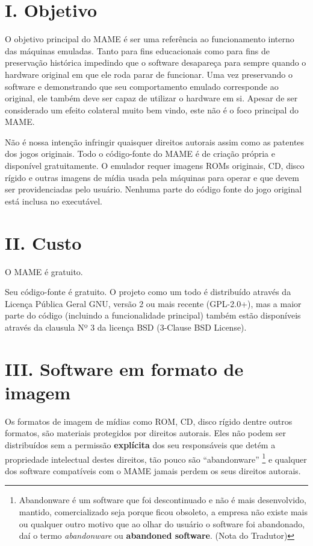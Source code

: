 \documentclass[letterpaper,10pt,brazil]{sphinxmanual}
\begin{document}
\section{I. Objetivo}
\label{whatis:i-objetivo}
O objetivo principal do MAME é ser uma referência ao funcionamento
interno das máquinas emuladas. Tanto para fins educacionais como para
fins de preservação histórica impedindo que o software desapareça para
sempre quando o hardware original em que ele roda parar de funcionar.
Uma vez preservando o software e demonstrando que seu comportamento
emulado corresponde ao original, ele também deve ser capaz de utilizar o
hardware em si. Apesar de ser considerado um efeito colateral muito bem
vindo, este não é o foco principal do MAME.

Não é nossa intenção infringir quaisquer direitos autorais assim como as
patentes dos jogos originais. Todo o código-fonte do MAME é de criação
própria e disponível gratuitamente. O emulador requer imagens ROMs
originais, CD, disco rígido e outras imagens de mídia usada pela máquinas
para operar e que devem ser providenciadas pelo usuário. Nenhuma parte
do código fonte do jogo original está inclusa no executável.
\clearpage

\section{II. Custo}
\label{whatis:ii-custo}
O MAME é gratuito.

Seu código-fonte é gratuito. O projeto como um todo é distribuído
através da Licença Pública Geral GNU, versão 2 ou mais recente
(GPL-2.0+), mas a maior parte do código (incluindo a funcionalidade
principal) também estão disponíveis através da clausula Nº 3 da licença
BSD (3-Clause BSD License).


\section{III. Software em formato de imagem}
\label{whatis:iii-software-em-formato-de-imagem}
Os formatos de imagem de mídias como ROM, CD, disco rígido dentre outros
formatos, são materiais protegidos por direitos autorais.
Eles não podem ser distribuídos sem a permissão \textbf{explícita} dos
seu responsáveis que detém a propriedade intelectual destes direitos,
tão pouco são ``abandonware'' \footnote[1]{\sphinxAtStartFootnote%
Abandonware é um software que foi descontinuado e não é mais
desenvolvido, mantido, comercializado seja porque ficou
obsoleto, a empresa não existe mais ou qualquer outro motivo que
ao olhar do usuário o software foi abandonado, daí o termo
\emph{abandonware} ou \textbf{abandoned software}. (Nota do Tradutor)
} e qualquer dos software compatíveis com o
MAME jamais perdem os seus direitos autorais.
\end{document}
